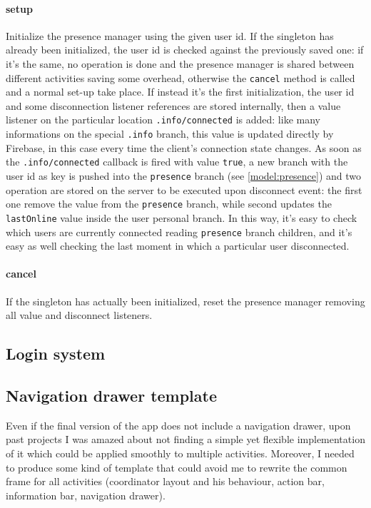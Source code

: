 			\paragraph{setup}
			Initialize the presence manager using the given user id.
			If the singleton has already been initialized, the user id is checked against the previously saved one: if it's the same, no operation is done  and the presence manager is shared between different activities saving some overhead, otherwise the \lstinline|cancel| method is called and a normal set-up take place.
			If instead it's the first initialization, the user id and some disconnection listener references are stored internally, then a value listener on the particular location \lstinline|.info/connected| is added: like many informations on the special \lstinline|.info| branch, this value is updated directly by Firebase, in this case every time the client's connection state changes.
			As soon as the \lstinline|.info/connected| callback is fired with value \lstinline|true|, a new branch with the user id as key is pushed into the \lstinline|presence| branch (see \autoref{model:presence}) and two operation are stored on the server to be executed upon disconnect event: the first one remove the value from the \lstinline|presence| branch, while second updates the \lstinline|lastOnline| value inside the user personal branch.
			In this way, it's easy to check which users are currently connected reading  \lstinline|presence| branch children, and it's easy as well checking the last moment in which a particular user disconnected.
			
			\paragraph{cancel}
			If the singleton has actually been initialized, reset the presence manager removing all value and disconnect listeners.
		
		\subsection{Login system}\label{focus:splash}
		
		\subsection{Navigation drawer template}\label{focus:drawer}
		
			Even if the final version of the app does not include a navigation drawer, upon past projects I was amazed about not finding a simple yet flexible implementation of it which could be applied smoothly to multiple activities.
			Moreover, I needed to produce some kind of template that could avoid me to rewrite the common frame for all activities (coordinator layout and his behaviour, action bar, information bar, navigation drawer).
			
